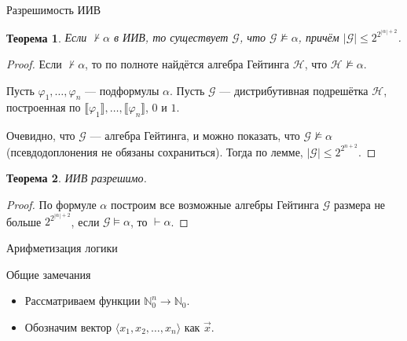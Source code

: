 \documentclass[aspectratio=169]{beamer}
\newtheorem{thm}{Теорема}[section]
\begin{document}
\begin{frame}{Разрешимость ИИВ}
\begin{thm}Если $\not\vdash \alpha$ в ИИВ, то существует $\mathcal{G}$,
что $\mathcal{G} \not\models \alpha$, причём $|\mathcal{G}| \le 2^{2^{|\alpha|+2}}$.
\end{thm}
\begin{proof}Если $\not\vdash \alpha$, то по 
полноте найдётся алгебра Гейтинга $\mathcal{H}$, что
$\mathcal{H} \not\models \alpha$. 

Пусть $\varphi_1, \dots, \varphi_n$ --- подформулы $\alpha$.
Пусть $\mathcal{G}$ --- дистрибутивная подрешётка $\mathcal{H}$, 
построенная по $\llbracket \varphi_1 \rrbracket, \dots, \llbracket \varphi_n \rrbracket$, $0$ и $1$. 

Очевидно, что $\mathcal{G}$ --- алгебра Гейтинга, и можно показать, 
что $\mathcal{G} \not\models \alpha$ (псевдодоплонения не обязаны сохраниться).
Тогда по лемме, $|\mathcal{G}| \le 2^{2^{n+2}}$. 
\end{proof}

\begin{thm}ИИВ разрешимо.
\end{thm}
\begin{proof}По формуле $\alpha$ построим все возможные алгебры Гейтинга $\mathcal{G}$ размера не больше $2^{2^{|\alpha|+2}}$,
если $\mathcal{G}\models\alpha$, то $\vdash\alpha$.
\end{proof}
\end{frame}

\begin{frame}
\begin{center}\LARGE Арифметизация логики\end{center}
\end{frame}

\begin{frame}{Общие замечания}
\begin{itemize}
\item Рассматриваем функции $\mathbb{N}^n_0\to\mathbb{N}_0$.
\item Обозначим вектор $\langle x_1, x_2, \dots, x_n\rangle$ как $\overrightarrow{x}$.
\end{itemize}
\end{frame}
\end{document}
